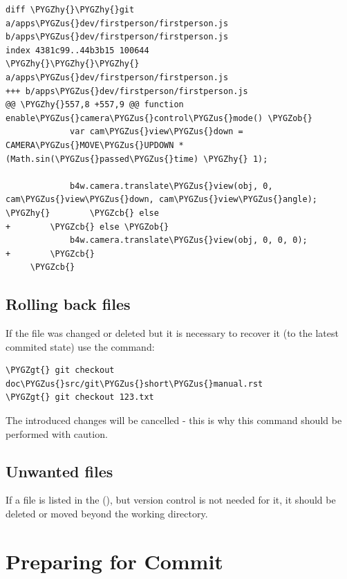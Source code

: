 \documentclass[a4paper,12pt,oneside]{sphinxmanual}
\def\PYGZus{\char`\_}
\def\PYGZob{\char`\{}
\def\PYGZcb{\char`\}}
\def\PYGZgt{\char`\>}
\def\PYGZhy{\char`\-}
\begin{document}
\begin{Verbatim}[commandchars=\\\{\}]
diff \PYGZhy{}\PYGZhy{}git a/apps\PYGZus{}dev/firstperson/firstperson.js b/apps\PYGZus{}dev/firstperson/firstperson.js
index 4381c99..44b3b15 100644
\PYGZhy{}\PYGZhy{}\PYGZhy{} a/apps\PYGZus{}dev/firstperson/firstperson.js
+++ b/apps\PYGZus{}dev/firstperson/firstperson.js
@@ \PYGZhy{}557,8 +557,9 @@ function enable\PYGZus{}camera\PYGZus{}control\PYGZus{}mode() \PYGZob{}
             var cam\PYGZus{}view\PYGZus{}down = CAMERA\PYGZus{}MOVE\PYGZus{}UPDOWN * (Math.sin(\PYGZus{}passed\PYGZus{}time) \PYGZhy{} 1);

             b4w.camera.translate\PYGZus{}view(obj, 0, cam\PYGZus{}view\PYGZus{}down, cam\PYGZus{}view\PYGZus{}angle);
\PYGZhy{}        \PYGZcb{} else
+        \PYGZcb{} else \PYGZob{}
             b4w.camera.translate\PYGZus{}view(obj, 0, 0, 0);
+        \PYGZcb{}
     \PYGZcb{}
\end{Verbatim}


\subsection{Rolling back files}
\label{git_short_manual:id7}
If the file was changed or deleted but it is necessary to recover it (to the latest commited state) use the command:

\begin{Verbatim}[commandchars=\\\{\}]
\PYGZgt{} git checkout doc\PYGZus{}src/git\PYGZus{}short\PYGZus{}manual.rst
\PYGZgt{} git checkout 123.txt
\end{Verbatim}

The introduced changes will be cancelled - this is why this command should be performed with caution.


\subsection{Unwanted files}
\label{git_short_manual:id8}
If a file is listed in the  (), but version control is not needed for it, it should be deleted or moved beyond the working directory.


\section{Preparing for Commit}
\label{git_short_manual:index-4}\label{git_short_manual:git-example-add-rm-commit}\label{git_short_manual:id9}
\end{document}
